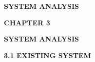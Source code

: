 \vspace*{\fill}
\begin{center}
  {\fontsize{18pt}{24pt}\selectfont\bfseries SYSTEM ANALYSIS\par}
\end{center}
\vspace*{\fill}
\newpage

\begin{center}
  {\fontsize{16pt}{20pt}\selectfont\bfseries CHAPTER 3\par}
  \vspace{0.3cm}
  {\fontsize{16pt}{20pt}\selectfont\bfseries SYSTEM ANALYSIS\par}
\end{center}
\vspace{0.4cm}

{\fontsize{14pt}{18pt}\selectfont\bfseries 3.1 EXISTING SYSTEM\par}
\vspace{0.3cm}

